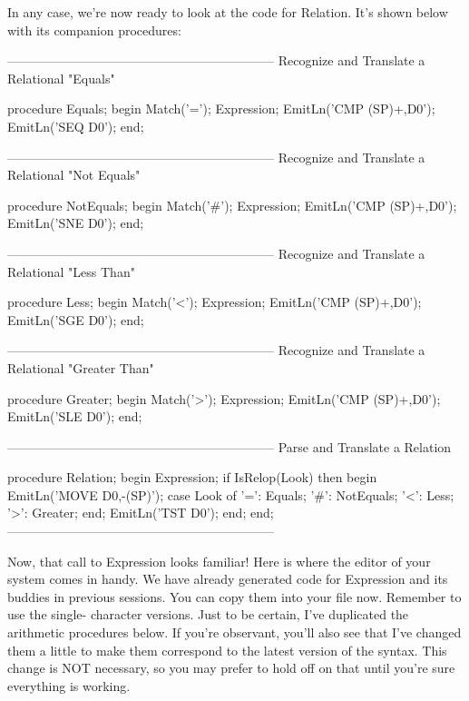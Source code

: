 \documentclass[float=false, crop=false]{standalone}
\begin{document}
In any case, we're now ready to look at the code for Relation. It's shown below
with its companion procedures:

\begin{code}
{---------------------------------------------------------------}
{ Recognize and Translate a Relational "Equals" }

procedure Equals;
begin
   Match('=');
   Expression;
   EmitLn('CMP (SP)+,D0');
   EmitLn('SEQ D0');
end;


{---------------------------------------------------------------}
{ Recognize and Translate a Relational "Not Equals" }

procedure NotEquals;
begin
   Match('#');
   Expression;
   EmitLn('CMP (SP)+,D0');
   EmitLn('SNE D0');
end;


{---------------------------------------------------------------}
{ Recognize and Translate a Relational "Less Than" }

procedure Less;
begin
   Match('<');
   Expression;
   EmitLn('CMP (SP)+,D0');
   EmitLn('SGE D0');
end;


{---------------------------------------------------------------}
{ Recognize and Translate a Relational "Greater Than" }

procedure Greater;
begin
   Match('>');
   Expression;
   EmitLn('CMP (SP)+,D0');
   EmitLn('SLE D0');
end;

{---------------------------------------------------------------}
{ Parse and Translate a Relation }

procedure Relation;
begin
   Expression;
   if IsRelop(Look) then begin
      EmitLn('MOVE D0,-(SP)');
      case Look of
       '=': Equals;
       '#': NotEquals;
       '<': Less;
       '>': Greater;
      end;
   EmitLn('TST D0');
   end;
end;
{---------------------------------------------------------------}
\end{code}

Now, that call to Expression looks familiar! Here is where the editor of your
system comes in handy. We have already generated code for Expression and its
buddies in previous sessions. You can copy them into your file now. Remember to
use the single- character versions. Just to be certain, I've duplicated the
arithmetic procedures below. If you're observant, you'll also see that I've
changed them a little to make them correspond to the latest version of the
syntax. This change is NOT necessary, so you may prefer to hold off on that
until you're sure everything is working.
\end{document}
